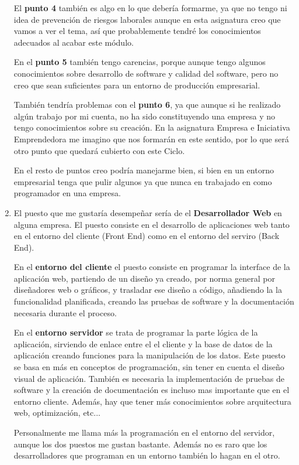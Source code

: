 \begin{enumerate}[label=(\alph*)]
     El \textbf{punto 4} también es algo en lo que debería formarme, ya que no tengo ni idea de prevención de riesgos laborales aunque en esta asignatura creo que vamos a ver el tema, así que probablemente tendré los conocimientos adecuados al acabar este módulo.

     En el \textbf{punto 5} también tengo carencias, porque aunque tengo algunos conocimientos sobre desarrollo de software y calidad del software, pero no creo que sean suficientes para un entorno de producción empresarial.

     También tendría problemas con el \textbf{punto 6}, ya que aunque si he realizado algún trabajo por mi cuenta, no ha sido constituyendo una empresa y no tengo conocimientos sobre su creación. En la asignatura Empresa e Iniciativa Emprendedora me imagino que nos formarán en este sentido, por lo que será otro punto que quedará cubierto con este Ciclo.

     En el resto de puntos creo podría manejarme bien, si bien en un entorno empresarial tenga que pulir algunos ya que nunca en trabajado en como programador en una empresa.

     \item El puesto que me gustaría desempeñar sería de el \textbf{Desarrollador Web} en alguna empresa. El puesto consiste en el desarrollo de aplicaciones web tanto en el entorno del cliente (Front End) como en el entorno del serviro (Back End).

     En el \textbf{entorno del cliente} el puesto consiste en programar la interface de la aplicación web, partiendo de un diseño ya creado, por norma general por diseñadores web o gráficos, y trasladar ese diseño a código, añadiendo la la funcionalidad planificada, creando las pruebas de software y la documentación necesaria durante el proceso.

     En el \textbf{entorno servidor} se trata de programar la parte lógica de la aplicación, sirviendo de enlace entre el el cliente y la base de datos de la aplicación creando funciones para la manipulación de los datos. Este puesto se basa en más en conceptos de programación, sin tener en cuenta el diseño visual de aplicación. También es necesaria la implementación de pruebas de software y la creación de documentación es incluso mas importante que en el entorno cliente. Además, hay que tener más conocimientos sobre arquitectura web, optimización, etc...

     Personalmente me llama más la programación en el entorno del servidor, aunque los dos puestos me gustan bastante. Además no es raro que los desarrolladores que programan en un entorno también lo hagan en el otro.
\end{enumerate}

